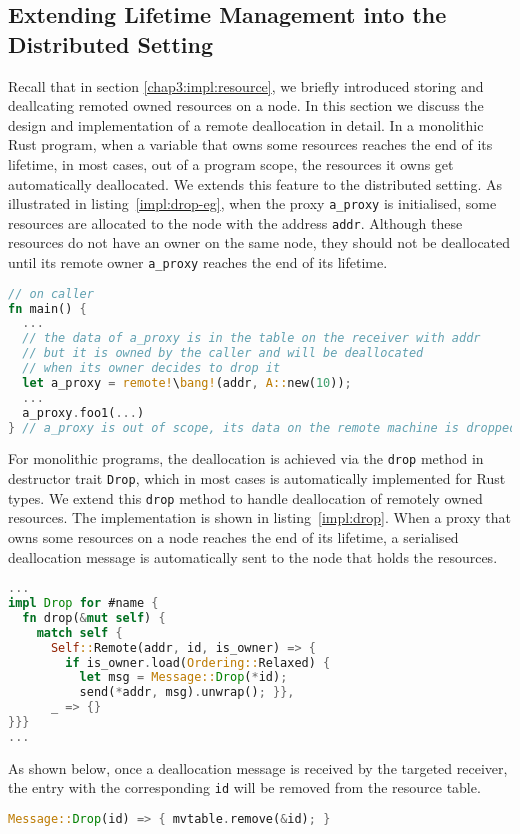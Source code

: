\subsection{Extending Lifetime Management into the Distributed Setting}
\label{impl:lifetime}
Recall that in section \ref{chap3:impl:resource}, we briefly introduced storing and deallcating remoted owned resources on a node. In this section we discuss the design and implementation of a remote deallocation in detail. In a monolithic Rust program, when a variable that owns some resources reaches the end of its lifetime, in most cases, out of a program scope, the resources it owns get automatically deallocated. We extends this feature to the distributed setting. As illustrated in listing~\ref{impl:drop-eg}, when the proxy \texttt{a\_proxy} is initialised, some resources are allocated to the node with the address \texttt{addr}. Although these resources do not have an owner on the same node, they should not be deallocated until its remote owner \texttt{a\_proxy} reaches the end of its lifetime. 
\begin{lstlisting}[language=Rust, style=boxed, basicstyle=\footnotesize\ttfamily, caption={An example of a remote deallocation}, label=impl:drop-eg]
// on caller
fn main() {
  ...
  // the data of a_proxy is in the table on the receiver with addr
  // but it is owned by the caller and will be deallocated
  // when its owner decides to drop it
  let a_proxy = remote!\bang!(addr, A::new(10)); 
  ...
  a_proxy.foo1(...)
} // a_proxy is out of scope, its data on the remote machine is dropped
\end{lstlisting}
For monolithic programs, the deallocation is achieved via the \texttt{drop} method in destructor trait \texttt{Drop}, which in most cases is automatically implemented for Rust types. We extend this \texttt{drop} method to handle deallocation of remotely owned resources. The implementation is shown in listing~\ref{impl:drop}.
When a proxy that owns some resources on a node reaches the end of its lifetime, a serialised deallocation message is automatically sent to the node that holds the resources. 
\begin{lstlisting}[language=Rust, style=boxed, basicstyle=\footnotesize\ttfamily, caption={The implementation of a remote deallocation}, label=impl:drop]
...
impl Drop for #name {
  fn drop(&mut self) {
    match self {
      Self::Remote(addr, id, is_owner) => {
        if is_owner.load(Ordering::Relaxed) {
          let msg = Message::Drop(*id);
          send(*addr, msg).unwrap(); }},
      _ => {}
}}}
...
\end{lstlisting}
As shown below, once a deallocation message is received by the targeted receiver, the entry with the corresponding \texttt{id} will be removed from the resource table.
\begin{lstlisting}[language=Rust, style=boxed, basicstyle=\footnotesize\ttfamily]
Message::Drop(id) => { mvtable.remove(&id); }
\end{lstlisting}\textbf{}


